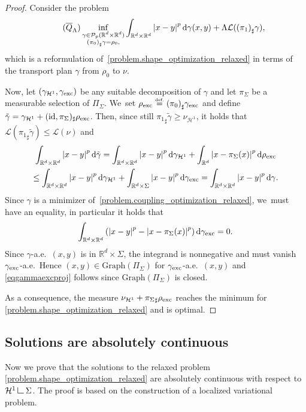 \documentclass[JEP,XML,SOM,Unicode,NoFloatCountersInSection,published]{cedram}
\theoremstyle{definition}
\newcommand{\eqdef}{\ensuremath{\stackrel{\mbox{\upshape\tiny def.}}{=}}}
\newcommand\LM[1]{\hbox{\vrule width.5pt \vbox to#1pt{\vfill \hrule width#1pt height.5pt}}}
\newcommand\LL{{\mathchoice {\>\LM7\>}{\>\LM7\>}{\,\LM5\,}{\,\LM{3.35}\,}}}
\newcommand{\mres}{\LL}
\newcommand\cH{\mathcal{H}}
\newcommand{\RR}{\mathbb{R}}
\newcommand{\nuH}{\nu_{\cH^1}}
\newcommand{\rhoexc}{\rho_{\textup{exc}}}
\newcommand{\gammaexc}{\gamma_{\textup{exc}}}
\newcommand{\gammaH}{\gamma_{\cH^1}}
\newcommand\dd{\mathrm{d}}
\newcommand{\abs}[1]{\left\lvert#1\right\rvert}
\begin{document}
\begin{proof}
Consider the problem\vspace*{-3pt}
\begin{align}
\label{problem.coupling_optimization_relaxed}
\tag{$\overline{Q}_\Lambda$}
\inf_{
\substack{
\gamma \in \mathcal{P}_p(\RR^d\times \RR^d)\\
{(\pi_{0})}_\sharp\gamma = \rho_0,
}
}
\int_{{\RR^d\times \RR^d}}\abs{x-y}^p\dd \gamma(x,y) + \Lambda \mathcal{L}({(\pi_{1})}_\sharp\gamma),
\end{align}
which is a reformulation of~\eqref{problem.shape_optimization_relaxed} in
terms of the transport plan $\gamma$ from $\rho_0$ to $\nu$.

Now, let $(\gammaH,\gammaexc)$ be any suitable decomposition of $\gamma$ and let $\pi_\Sigma$ be a measurable selection of $\Pi_\Sigma$. We~set $\rhoexc\eqdef {(\pi_{0})}_\sharp\gammaexc$ and define $\tilde{\gamma} = \gammaH + (\text{id},\pi_\Sigma)_{\sharp}\rhoexc$. Then,
since still ${\pi_1}_\sharp \tilde{\gamma}\ge \nu_{\cH^1}$,
it holds that $\mathcal{L}({\pi_{1}}_\sharp\tilde{\gamma})\leq \mathcal{L}(\nu)$ and
\begin{multline*}
\int_{{\RR^d\times \RR^d}}
\abs{x-y}^p\dd \tilde{\gamma}
= \int_{{\RR^d\times \RR^d}}
\abs{x-y}^p\dd \gammaH
+
\int_{\RR^d}
\abs{x-\pi_{\Sigma}(x)}^p\dd\rhoexc \\
\leq \int_{{\RR^d\times \RR^d}}\abs{x-y}^p\dd \gammaH+ \int_{\RR^d\times \Sigma}\abs{x-y}^p\dd\gammaexc = \int_{{\RR^d\times \RR^d}}\abs{x-y}^p\dd {\gamma}.
\end{multline*}
Since $\gamma$ is a minimizer of~\eqref{problem.coupling_optimization_relaxed}, we~must have an equality, in particular it holds that
\begin{equation*}
\int_{\RR^d\times \RR^d}\left( \abs{x-y}^p-\abs{x-\pi_{\Sigma}(x)}^p\right)\dd\gammaexc = 0.
\end{equation*}
Since $\gamma$-a.e.~$(x,y)$ is in $\RR^d\times \Sigma$, the integrand is nonnegative and must vanish $\gammaexc$-a.e.\ Hence $(x,y) \in \mathrm{Graph}(\Pi_\Sigma)$ for $\gammaexc$-a.e.\ $(x,y)$ and \eqref{eqgammaexcproj} follows since $\mathrm{Graph}(\Pi_\Sigma)$ is closed.

As a consequence, the measure $\nuH + {\pi_{\Sigma}}_\sharp\rhoexc$ reaches the minimum for \eqref{problem.shape_optimization_relaxed} and is optimal.
\end{proof}

\subsection{Solutions are absolutely continuous}
Now we prove
that the solutions to the relaxed problem \eqref{problem.shape_optimization_relaxed} are absolutely continuous with respect to $\cH^1\mres\Sigma$. The proof is based on the construction of a localized variational problem.
\end{document}
